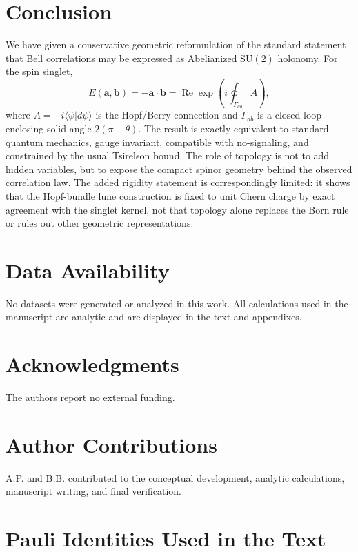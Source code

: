 \documentclass[
  aps,
  pra,
  reprint,
  superscriptaddress,
  nofootinbib,
  longbibliography,
  floatfix,
  amsmath,
  amssymb
]{revtex4-2}
\theoremstyle{plain}
\theoremstyle{definition}
\theoremstyle{remark}
\newcommand{\SU}{\mathrm{SU}}
\begin{document}
\section{Conclusion}
\label{sec:conclusion}

We have given a conservative geometric reformulation of the standard statement that Bell correlations may be expressed as Abelianized \(\SU(2)\) holonomy.  For the spin singlet,
\begin{equation}
E(\bm a,\bm b)=-\bm a\cdot\bm b
=\operatorname{Re}\exp\left(i\oint_{\Gamma_{ab}}A\right),
\end{equation}
where \(A=-i\langle\psi|d\psi\rangle\) is the Hopf/Berry connection and \(\Gamma_{ab}\) is a closed loop enclosing solid angle \(2(\pi-\theta)\).  The result is exactly equivalent to standard quantum mechanics, gauge invariant, compatible with no-signaling, and constrained by the usual Tsirelson bound.  The role of topology is not to add hidden variables, but to expose the compact spinor geometry behind the observed correlation law.  The added rigidity statement is correspondingly limited: it shows that the Hopf-bundle lune construction is fixed to unit Chern charge by exact agreement with the singlet kernel, not that topology alone replaces the Born rule or rules out other geometric representations.

\section*{Data Availability}
No datasets were generated or analyzed in this work. All calculations used in the manuscript are analytic and are displayed in the text and appendixes.

\section*{Acknowledgments}
The authors report no external funding.

\section*{Author Contributions}
A.P. and B.B. contributed to the conceptual development, analytic calculations, manuscript writing, and final verification.

\appendix

\section{Pauli Identities Used in the Text}
\label{app:pauli}
\end{document}
